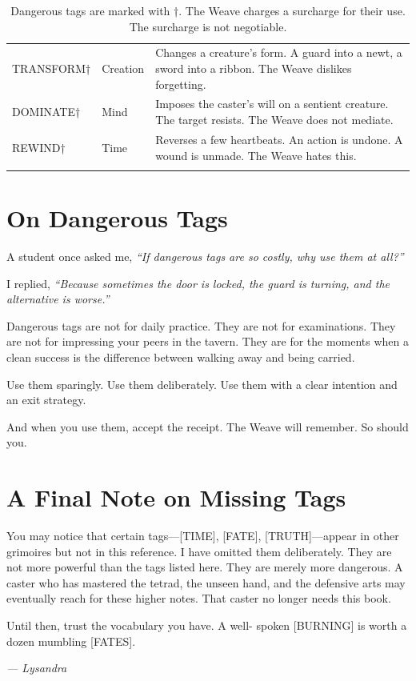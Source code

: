 \begin{longtable}{p{} p{} p{}}
TRANSFORM† & Creation & Changes a creature's form. A guard into a newt, a sword into a ribbon. The Weave dislikes forgetting. \\
DOMINATE† & Mind & Imposes the caster's will on a sentient creature. The target resists. The Weave does not mediate. \\
REWIND† & Time & Reverses a few heartbeats. An action is undone. A wound is unmade. The Weave hates this. \\
\hline
\caption*{Dangerous tags are marked with †. The Weave charges a surcharge for their use. The surcharge is not negotiable.}
\end{longtable}

\section{On Dangerous Tags}

A student once asked me, \emph{``If dangerous tags are so costly, why use them at all?''}

I replied, \emph{``Because sometimes the door is locked, the guard is turning, and the alternative is worse.''}

Dangerous tags are not for daily practice. They are not for examinations. They are not for impressing your peers in the tavern. They are for the moments when a clean success is the difference between walking away and being carried.

Use them sparingly. Use them deliberately. Use them with a clear intention and an exit strategy.

And when you use them, accept the receipt. The Weave will remember. So should you.

\section{A Final Note on Missing Tags}

You may notice that certain tags---[TIME], [FATE], [TRUTH]---appear in other grimoires but not in this reference. I have omitted them deliberately. They are not more powerful than the tags listed here. They are merely more dangerous. A caster who has mastered the tetrad, the unseen hand, and the defensive arts may eventually reach for these higher notes. That caster no longer needs this book.

Until then, trust the vocabulary you have. A well- spoken [BURNING] is worth a dozen mumbling [FATES].

\textit{--- Lysandra}
